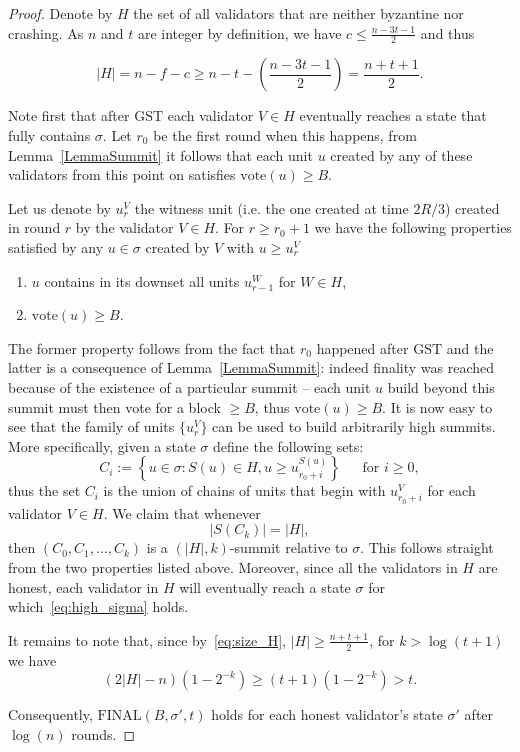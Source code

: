 \documentclass[12pt, fleqn]{article}
\newcommand{\vote}{\mathrm{vote}}
\newcommand{\final}{\mathrm{FINAL}}
\newcommand{\gst}{\mathrm{GST}}
\newcommand{\inparen}[1]{\left(#1\right)}
\newcommand{\inbraces}[1]{\left\{#1\right\}}
\begin{document}
\begin{proof}
Denote by $H$ the set of all validators that are neither byzantine nor crashing. As $n$ and $t$ are integer by definition, we have $c\leq \frac{n-3t-1}{2}$ and thus
%

\begin{equation}\label{eq:size_H}
 |H|=n-f-c\geq n-t-\inparen{\frac{n-3t-1}{2}} =  \frac{n+t+1}{2}.
\end{equation}

%
Note first that after $\gst$ each validator $V\in H$ eventually reaches a state that fully contains $\sigma$.
%
Let $r_0$ be the first round when this happens, from Lemma~\ref{LemmaSummit} it follows that each unit $u$ created by any of these validators from this point on satisfies $\vote(u) \geq B$.
%

Let us denote by $u^V_r$ the witness unit (i.e. the one created at time $2R/3$) created in round $r$ by the validator $V\in H$.
%
For $r\geq r_0+1$ we have the following properties satisfied by any $u\in \sigma$ created by $V$ with $u\geq u_{r}^V$
\begin{enumerate}
    \item $u$ contains in its downset all units $u^W_{r-1}$ for $W\in H$,
    \item $\vote(u) \geq B$.
\end{enumerate}
The former property follows from the fact that $r_0$ happened after $\gst$ and the latter is a consequence of Lemma~\ref{LemmaSummit}: indeed finality was reached because of the existence of a particular summit -- each unit $u$ build beyond this summit must then vote for a block  $\geq B$, thus $\vote(u)\geq B$.
%
It is now easy to see that the family of units $\{u_r^V\}$ can be used to build arbitrarily high summits.
%
More specifically, given a state $\sigma$ define the following sets:
$$C_i:= \inbraces{u \in \sigma: S(u)\in H, u\geq u_{r_0+i}^{S(u)}} ~~~~~~~\mbox{for }i\geq 0,$$
thus the set $C_i$ is the union of chains of units that begin with $u_{r_0+i}^V$ for each validator $V\in H$.
%
We claim that whenever 
\begin{equation}\label{eq:high_sigma}
    |S(C_k)|=|H|,
\end{equation} then $(C_0, C_1, \ldots, C_k)$ is a $(|H|, k)$-summit relative to $\sigma$.
%
This follows straight from the two properties listed above.
%
Moreover, since all the validators in $H$ are honest, each validator in $H$ will eventually reach a state $\sigma$ for which~\eqref{eq:high_sigma} holds.

It remains to note that, since by~\eqref{eq:size_H}, $|H|\geq  \frac{n+t+1}{2}$, for $k>\log(t+1)$ we have
$$(2|H|-n)(1-2^{-k}) \geq (t+1)(1-2^{-k})>t.$$

Consequently, $\final(B, \sigma', t)$ holds for each honest validator's state $\sigma'$ after $\log(n)$ rounds.

\end{proof}
\end{document}
